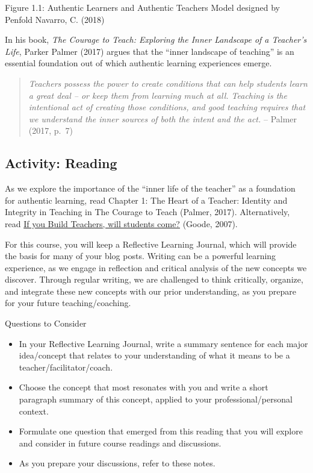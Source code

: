\documentclass[
]{book}
\providecommand{\tightlist}{%
  \setlength{\itemsep}{0pt}\setlength{\parskip}{0pt}}
\begin{document}
Figure 1.1: Authentic Learners and Authentic Teachers Model designed by Penfold Navarro, C. (2018)

In his book, \emph{The Courage to Teach: Exploring the Inner Landscape of a Teacher's Life}, Parker Palmer (2017) argues that the ``inner landscape of teaching'' is an essential foundation out of which authentic learning experiences emerge.

\begin{quote}
\emph{Teachers possess the power to create conditions that can help students learn a great deal -- or keep them from learning much at all. Teaching is the intentional act of creating those conditions, and good teaching requires that we understand the inner sources of both the intent and the act.} -- Palmer (2017, p.~7)
\end{quote}

\hypertarget{activity-reading}{%
\subsection*{Activity: Reading}\label{activity-reading}}

\begin{reflect}
As we explore the importance of the ``inner life of the teacher'' as a
foundation for authentic learning, read Chapter 1: The Heart of a
Teacher: Identity and Integrity in Teaching in The Courage to Teach
(Palmer, 2017). Alternatively, read
\href{https://journals-sagepub-com.twu.idm.oclc.org/doi/pdf/10.2190/2102-5G77-QL77-5506}{If
you Build Teachers, will students come?} (Goode, 2007).

For this course, you will keep a Reflective Learning Journal, which will
provide the basis for many of your blog posts. Writing can be a powerful
learning experience, as we engage in reflection and critical analysis of
the new concepts we discover. Through regular writing, we are challenged
to think critically, organize, and integrate these new concepts with our
prior understanding, as you prepare for your future teaching/coaching.

{Questions to Consider}

\begin{itemize}
\tightlist
\item
  In your Reflective Learning Journal, write a summary sentence for each
  major idea/concept that relates to your understanding of what it means
  to be a teacher/facilitator/coach.\\
\item
  Choose the concept that most resonates with you and write a short
  paragraph summary of this concept, applied to your
  professional/personal context.\\
\item
  Formulate one question that emerged from this reading that you will
  explore and consider in future course readings and discussions.\\
\item
  As you prepare your discussions, refer to these notes.
\end{itemize}
\end{reflect}
\end{document}
